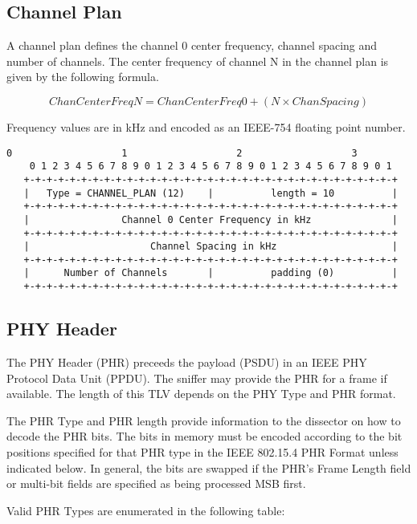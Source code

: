 \documentclass[12pt]{article}
\renewcommand\_{\textunderscore\allowbreak}
\begin{document}
\newpage
\subsection{Channel Plan}
 
A channel plan defines the channel 0 center frequency, channel spacing and
number of channels.  The center frequency of channel N in the channel plan is
given by the following formula.

\[ ChanCenterFreqN = ChanCenterFreq0 + (N \times ChanSpacing) \]
 
Frequency values are in kHz and encoded as an IEEE-754 floating point number.
 
\begin{Verbatim}[samepage=true]
    0                   1                   2                   3
    0 1 2 3 4 5 6 7 8 9 0 1 2 3 4 5 6 7 8 9 0 1 2 3 4 5 6 7 8 9 0 1
   +-+-+-+-+-+-+-+-+-+-+-+-+-+-+-+-+-+-+-+-+-+-+-+-+-+-+-+-+-+-+-+-+
   |   Type = CHANNEL_PLAN (12)    |          length = 10          |
   +-+-+-+-+-+-+-+-+-+-+-+-+-+-+-+-+-+-+-+-+-+-+-+-+-+-+-+-+-+-+-+-+
   |                Channel 0 Center Frequency in kHz              |
   +-+-+-+-+-+-+-+-+-+-+-+-+-+-+-+-+-+-+-+-+-+-+-+-+-+-+-+-+-+-+-+-+
   |                     Channel Spacing in kHz                    |
   +-+-+-+-+-+-+-+-+-+-+-+-+-+-+-+-+-+-+-+-+-+-+-+-+-+-+-+-+-+-+-+-+
   |      Number of Channels       |          padding (0)          |
   +-+-+-+-+-+-+-+-+-+-+-+-+-+-+-+-+-+-+-+-+-+-+-+-+-+-+-+-+-+-+-+-+
\end{Verbatim}

\subsection{PHY Header}

The PHY Header (PHR) preceeds the payload (PSDU) in an IEEE PHY Protocol Data
Unit (PPDU).  The sniffer may provide the PHR for a frame if available.
The length of this TLV depends on the PHY Type and PHR format.

The PHR Type and PHR length provide information to the dissector on how to
decode the PHR bits.  The bits in memory must be encoded according to the bit
positions specified for that PHR type in the IEEE 802.15.4 PHR Format unless
indicated below.  In general, the bits are swapped if the PHR's Frame Length
field or multi-bit fields are specified as being processed MSB first.

Valid PHR Types are enumerated in the following table:
\end{document}
